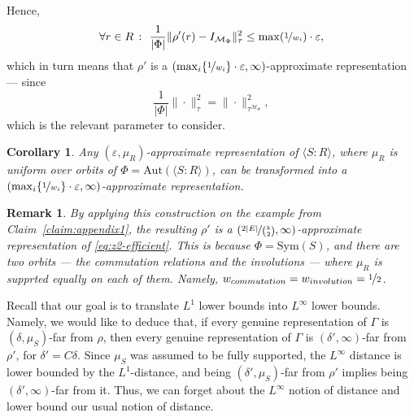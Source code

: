 \documentclass[11pt]{article}
\newtheorem{corollary}[theorem]{Corollary}
\newtheorem{remark}[theorem]{Remark}
\theoremstyle{definition}
\newcommand{\Id}{\ensuremath{I}}
\newcommand{\mM}{\ensuremath{\mathcal{M}}}
\newcommand{\eps}{\varepsilon}
\begin{document}
    Hence, 
    \[
    \forall r\in R\ \colon\ \frac{1}{|\Phi|}\|\rho'(r)-\Id_{\mM_\Phi}\|_\tau^2\leq \max({\nicefrac{1}{w_i}})\cdot\eps,
    \]
which in turn means that $\rho'$ is a $(\max_i\{{\nicefrac{1}{w_i}}\}\cdot\eps,\infty)$-approximate representation --- since $$\frac{1}{|\Phi|}\|\cdot\|_\tau^2=\|\cdot\|_{\tau^{\mM_\Phi}}^2,$$
which is the relevant parameter to consider.
\begin{corollary}
    Any $(\eps,\mu_R)$-approximate representation of $\langle S\colon R\rangle$, where $\mu_R$ is uniform over orbits of $\Phi=\textrm{Aut}(\langle S\colon R\rangle)$, can be transformed into a $(\max_i\{{\nicefrac{1}{w_i}}\}\cdot\eps,\infty)$-approximate representation. 
\end{corollary}
\begin{remark}
    By applying this construction on the example from Claim~\ref{claim:appendix1}, the resulting $\rho'$ is a $(\nicefrac{2|E|}{\binom{k}{2}},\infty)$-approximate representation of \eqref{eq:z2-efficient}. This is because $\Phi=\textrm{Sym}(S)$, and there are two  orbits --- the commutation relations and the involutions --- where $\mu_R$ is supprted equally on each of them. Namely, $w_{commutation}=w_{involution}=\nicefrac{1}{2}$.
\end{remark}
Recall that our goal is to translate $L^1$ lower bounds into $L^\infty$ lower bounds. Namely, we would like to deduce that, if every genuine representation of $\Gamma$ is $(\delta,\mu_S)$-far from $\rho$, then every genuine representation of $\Gamma$ is $(\delta',\infty)$-far from $\rho'$, for $\delta'=C\delta$.  Since $\mu_S$ was assumed to be fully supported, the $L^\infty$ distance is lower bounded by the $L^1$-distance, and being $(\delta',\mu_S)$-far from $\rho'$ implies being $(\delta',\infty)$-far from it. Thus, we can forget about the $L^\infty$ notion of distance and lower bound our usual notion of distance.
\end{document}
